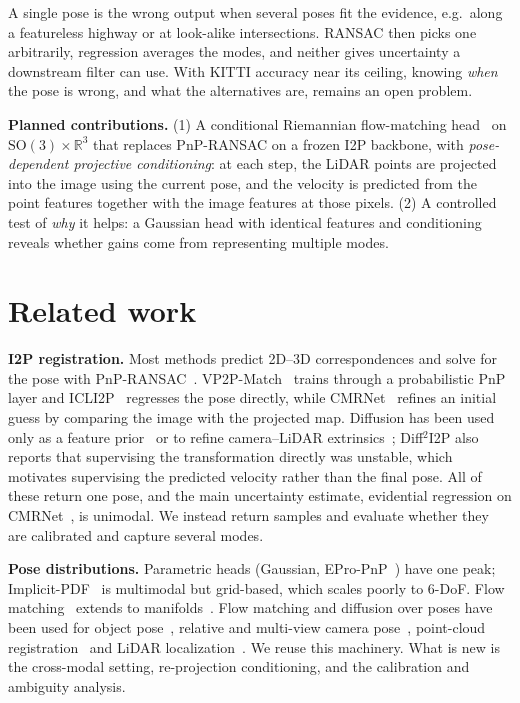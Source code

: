 \documentclass{article}
\newcommand{\R}{\mathbb{R}}
\newcommand{\SO}{\mathrm{SO}(3)}
\begin{document}
A single pose is the wrong output when several poses fit the evidence, e.g.\ along a featureless highway or at look-alike intersections. RANSAC then picks one arbitrarily, regression averages the modes, and neither gives uncertainty a downstream filter can use. With KITTI accuracy near its ceiling, knowing \emph{when} the pose is wrong, and what the alternatives are, remains an open problem.

\textbf{Planned contributions.} (1) A conditional Riemannian flow-matching head~\cite{lipman2023flow,chen2024riemannian} on $\SO\times\R^3$ that replaces PnP-RANSAC on a frozen I2P backbone, with \emph{pose-dependent projective conditioning}: at each step, the LiDAR points are projected into the image using the current pose, and the velocity is predicted from the point features together with the image features at those pixels. (2) A controlled test of \emph{why} it helps: a Gaussian head with identical features and conditioning reveals whether gains come from representing multiple modes.

\section{Related work}
\label{sec:related}

\textbf{I2P registration.}
Most methods predict 2D--3D correspondences and solve for the pose with PnP-RANSAC~\cite{ren2022corri2p,kang2024cofii2p}.
VP2P-Match~\cite{zhou2023vp2p} trains through a probabilistic PnP layer and ICLI2P~\cite{li2025icli2p} regresses the pose directly, while CMRNet~\cite{cattaneo2019cmrnet} refines an initial guess by comparing the image with the projected map.
Diffusion has been used only as a feature prior~\cite{mu2025diff2i2p} or to refine camera--LiDAR extrinsics~\cite{ou2025diffcalib}; Diff$^2$I2P also reports that supervising the transformation directly was unstable, which motivates supervising the predicted velocity rather than the final pose.
All of these return one pose, and the main uncertainty estimate, evidential regression on CMRNet~\cite{vaghi2022uncertainty}, is unimodal.
We instead return samples and evaluate whether they are calibrated and capture several modes.

\textbf{Pose distributions.}
Parametric heads (Gaussian, EPro-PnP~\cite{chen2022epropnp}) have one peak; Implicit-PDF~\cite{murphy2021ipdf} is multimodal but grid-based, which scales poorly to 6-DoF.
Flow matching~\cite{lipman2023flow,liu2023rectified} extends to manifolds~\cite{chen2024riemannian}.
Flow matching and diffusion over poses have been used for object pose~\cite{jin2025se3poseflow}, relative and multi-view camera pose~\cite{kuczkowski2026posefm,tran2026quacamfm,wang2023posediffusion}, point-cloud registration~\cite{jiang2023se3diffreg} and LiDAR localization~\cite{wang2025bevdiffloc,krummenacher2025diffpr}.
We reuse this machinery. What is new is the cross-modal setting, re-projection conditioning, and the calibration and ambiguity analysis.
\end{document}
